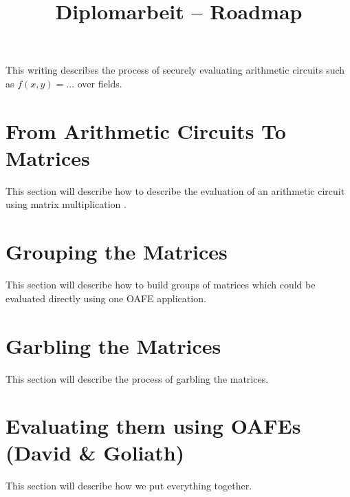 \documentclass[12pt, a4paper, openright]{article}
\title{Diplomarbeit -- Roadmap}
\begin{document}
\maketitle

This writing describes the process of securely evaluating arithmetic circuits
such as $f(x,y) = ...$ over fields.

\section{From Arithmetic Circuits To Matrices}

This section will describe how to describe the evaluation of an arithmetic
circuit using matrix multiplication \cite{cleve91}.


\section{Grouping the Matrices}

This section will describe how to build groups of matrices which could be
evaluated directly using one OAFE application.


\section{Garbling the Matrices}

This section will describe the process of garbling the matrices.


\section{Evaluating them using OAFEs (David \& Goliath)}

This section will describe how we put everything together.


\end{document}
